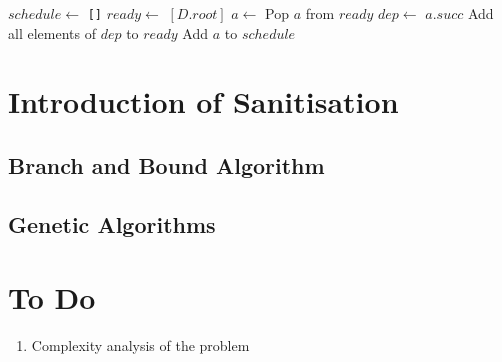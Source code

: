 \documentclass[12pts]{article}
\begin{document}
\begin{algorithm}
\begin{algorithmic}[0]
  \State $schedule \gets$ \texttt{[]}
  \State $ready \gets$ $[D.root]$
    \State $a \gets$ 
    \State Pop $a$ from $ready$
    \State $dep \gets$ $a.succ$ 
    \State Add all elements of $dep$ to $ready$
    \State Add $a$ to $schedule$
  \EndWhile
\EndProcedure
\end{algorithmic}
\end{algorithm}

\section{Introduction of Sanitisation}
\subsection{Branch and Bound Algorithm}

\subsection{Genetic Algorithms}

\section{To Do}
\begin{enumerate}
\item Complexity analysis of the problem
\end{enumerate}
\end{document}
